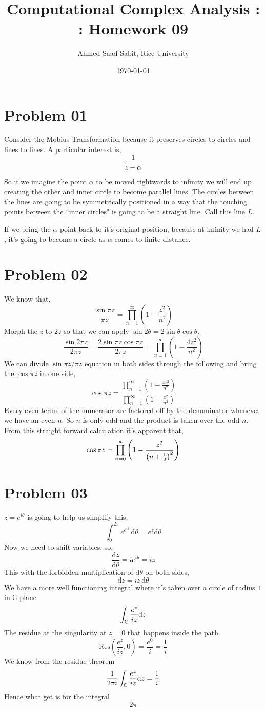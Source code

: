 \documentclass[letter]{article}
\title{Computational Complex Analysis : : Homework 09}
\author{Ahmed Saad Sabit, Rice University}
\date{\today}
\begin{document}
\maketitle
\section*{Problem 01} 
Consider the Mobius Transformation because it preserves circles to circles and lines to lines. A particular interest is, 
\[
\frac{1}{z - \alpha}
\] 

So if we imagine the point $\alpha$ to be moved rightwards to infinity we will end up creating the other and inner circle to become parallel lines. The circles between the lines are going to be symmetrically positioned in a way that the touching points between the ``inner circles" is going to be a straight line. Call this line $L$. 

If we bring the $\alpha$ point back to it's original position, because at infinity we had $L$, it's going to become a circle as $\alpha$ comes to finite distance. 


\section*{Problem 02} 
We know that, 
\[
\frac{\sin \pi z}{\pi z} = 
\prod_{n = 1}^{\infty} \left(1 - \frac{z^2}{n^2}\right)
\]
Morph the $z$ to $2z$ so that we can apply $\sin 2 \theta = 2 \sin \theta \cos \theta$. 
\[
\frac{\sin 2 \pi z}{2 \pi z} =  
\frac{2 \sin \pi z \cos \pi z}{2 \pi z} = 
\prod_{n = 1}^{\infty}
\left(
1 - 
\frac{4 z^2}{n^2}
\right)
\]
We can divide $\sin \pi z / \pi z $ equation in both sides through the following and bring the $\cos \pi z$ in one side, 
\[
{\cos \pi z} = 
\frac{\prod_{n = 1}^{\infty}
\left(
1 - 
\frac{4 z^2}{n^2}
\right)}
{
\prod_{n = 1}^{\infty} \left(1 - \frac{z^2}{n^2}\right)
}
\] 
Every even terms of the numerator are factored off by the denominator whenever we have an even $n$. So $n$ is only odd and the product is taken over the odd $n$. From this straight forward calculation it's apparent that, 
\[
	\cos \pi z = \prod_{n = 0}^{\infty} \left(1 - \frac{z^2 }{\left(n + {1 \over 2}\right)^2}\right)
\] 

\section*{Problem 03} 
$z = e^{i \theta}$ is going to help us simplify this, 
\[
\int_{0}^{ 2 \pi } e^{ e^{ i \theta}} \, \mathrm{d} \theta = e^{z} \mathrm{d}  \theta 
\]
Now we need to shift variables, so, 
\[
\frac{\mathrm{d} z}{\mathrm{d} \theta} = i e^{ i \theta} = i z
\]
This with the forbidden multiplication of $\mathrm{d} \theta$ on both sides, 
\[
\mathrm{d} z = i z \, \mathrm{d} \theta 
\] We have a more well functioning integral where it's taken over a circle of radius $1$ in $\mathbb{C}$ plane
\[
	\int_{\text{C}} {e ^{z}  \over i z } \mathrm{d} z 
\]
The residue at the singularity at $z = 0$ that happens inside the path
\[
\text{Res}\left(\frac{e^{z}}{i z} , 0 \right) = \frac{e^{0}}{i} = \frac{1}{i}
\]
We know from the residue theorem 
\[
\frac{1}{2 \pi i } 
	\int_{\text{C}} {e ^{z}  \over i z } \mathrm{d} z  = 
	\frac{1}{i}
\]
Hence what get is for the integral
\[
\boxed{
2 \pi
}
\]  
\end{document}
